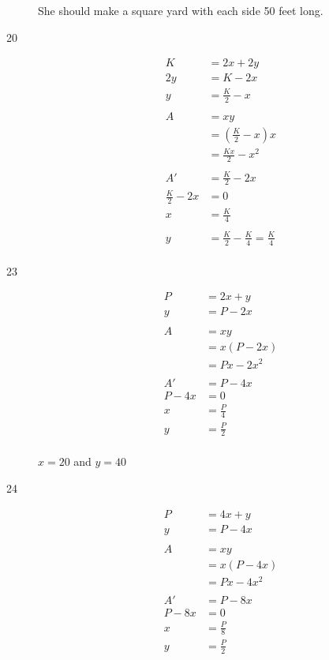 \documentclass[fleqn]{exam}
\begin{document}
\begin{description}
She should make a square yard with each side 50 feet long.

\item[20]
\begin{align*}
  K &= 2x + 2y \\
  2y &= K - 2x \\
  y  &= \frac{K}{2} - x \\
\\
  A &= xy \\
    &= \left(\frac{K}{2} - x \right) x \\
    &= \frac{Kx}{2} - x^2 \\
\\
  A' &= \frac{K}{2} - 2x \\
  \frac{K}{2} - 2x &= 0 \\
  x &= \frac{K}{4} \\
\\
  y &= \frac{K}{2} - \frac{K}{4} = \frac{K}{4} \\
\end{align*}

\item[23]
\begin{align*}
  P &= 2x + y \\
  y &= P - 2x \\
\\
  A &= xy \\
    &= x(P - 2x) \\
    &= Px - 2x^2 \\
\\
  A' &= P - 4x \\
  P - 4x &= 0 \\
  x &= \frac{P}{4} \\
  y &= \frac{P}{2} \\
\end{align*}

$x = 20$ and $y = 40$


\item[24]
\begin{align*}
  P &= 4x + y \\
  y &= P - 4x \\
\\
  A &= xy \\
    &= x(P - 4x) \\
    &= Px - 4x^2 \\
\\
  A' &= P - 8x \\
  P - 8x &= 0 \\
  x &= \frac{P}{8} \\
  y &= \frac{P}{2} \\
\end{align*}


\end{description}
\end{document}
